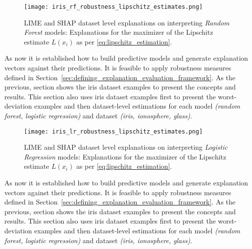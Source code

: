 \documentclass[english]{tktltiki2}
\theoremstyle{definition}
\theoremstyle{remark}
\begin{document}
\begin{figure}[H]
	\centering
	\texttt{[image: iris\_rf\_robustness\_lipschitz\_estimates.png]}
	\vspace*{-5mm}
	\caption{LIME and SHAP dataset level explanations on interpreting \textit{Random Forest} models: Explanations for the maximizer of the Lipschitz estimate $L(x_i)$ as per \eqref{eq:lipschitz_estimation}.}
	\label{fig:iris_rf_robustness_lipschitz_estimates}
\end{figure} 

As now it is established how to build predictive models and generate explanation vectors against their predictions. It is feasible to apply robustness measures defined in Section~\ref{sec:defining_explanation_evaluation_framework}. As the previous, section shows the iris dataset examples to present the concepts and results. This section also uses iris dataset examples first to present the worst-deviation examples and then dataset-level estimations for each model \textit{(random forest, logistic regression)} and dataset \textit{(iris, ionosphere, glass)}.

\begin{figure}[H]
	\centering
	\texttt{[image: iris\_lr\_robustness\_lipschitz\_estimates.png]}
	\vspace*{-5mm}
	\caption{LIME and SHAP dataset level explanations on interpreting \textit{Logistic Regression} models: Explanations for the maximizer of the Lipschitz estimate $L(x_i)$ as per \eqref{eq:lipschitz_estimation}.}
	\label{fig:iris_lr_robustness_lipschitz_estimates}
\end{figure} 

As now it is established how to build predictive models and generate explanation vectors against their predictions. It is feasible to apply robustness measures defined in Section~\ref{sec:defining_explanation_evaluation_framework}. As the previous, section shows the iris dataset examples to present the concepts and results. This section also uses iris dataset examples first to present the worst-deviation examples and then dataset-level estimations for each model \textit{(random forest, logistic regression)} and dataset \textit{(iris, ionosphere, glass)}.
\end{document}
